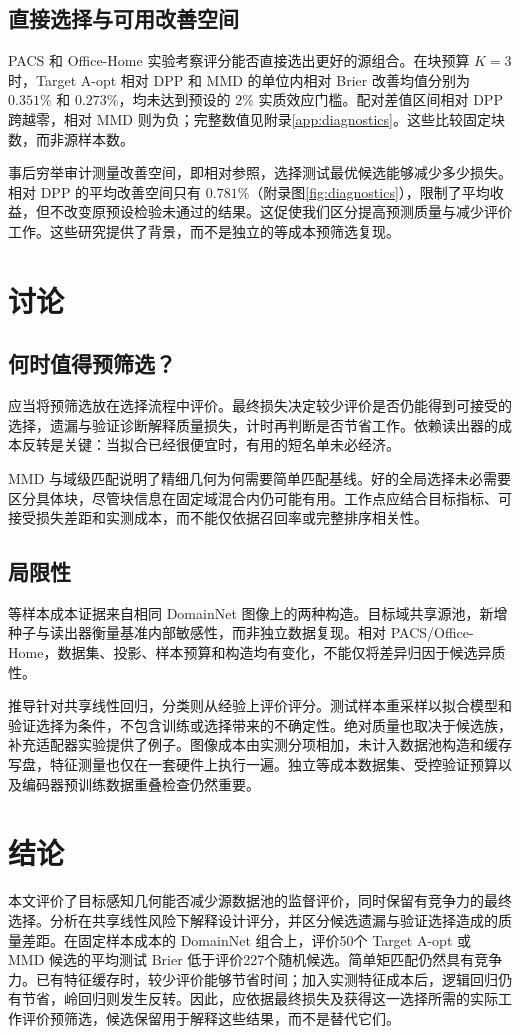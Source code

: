\subsection{直接选择与可用改善空间}
PACS 和 Office-Home 实验考察评分能否直接选出更好的源组合。在块预算 $K=3$ 时，Target A-opt 相对 DPP 和 MMD 的单位内相对 Brier 改善均值分别为 $0.351\%$ 和 $0.273\%$，均未达到预设的 $2\%$ 实质效应门槛。配对差值区间相对 DPP 跨越零，相对 MMD 则为负；完整数值见附录\ref{app:diagnostics}。这些比较固定块数，而非源样本数。

事后穷举审计测量改善空间，即相对参照，选择测试最优候选能够减少多少损失。相对 DPP 的平均改善空间只有 $0.781\%$（附录图\ref{fig:diagnostics}），限制了平均收益，但不改变原预设检验未通过的结果。这促使我们区分提高预测质量与减少评价工作。这些研究提供了背景，而不是独立的等成本预筛选复现。

\section{讨论}
\subsection{何时值得预筛选？}
应当将预筛选放在选择流程中评价。最终损失决定较少评价是否仍能得到可接受的选择，遗漏与验证诊断解释质量损失，计时再判断是否节省工作。依赖读出器的成本反转是关键：当拟合已经很便宜时，有用的短名单未必经济。

MMD 与域级匹配说明了精细几何为何需要简单匹配基线。好的全局选择未必需要区分具体块，尽管块信息在固定域混合内仍可能有用。工作点应结合目标指标、可接受损失差距和实测成本，而不能仅依据召回率或完整排序相关性。

\subsection{局限性}
\label{sec:limitations}
等样本成本证据来自相同 DomainNet 图像上的两种构造。目标域共享源池，新增种子与读出器衡量基准内部敏感性，而非独立数据复现。相对 PACS/Office-Home，数据集、投影、样本预算和构造均有变化，不能仅将差异归因于候选异质性。

推导针对共享线性回归，分类则从经验上评价评分。测试样本重采样以拟合模型和验证选择为条件，不包含训练或选择带来的不确定性。绝对质量也取决于候选族，补充适配器实验提供了例子。图像成本由实测分项相加，未计入数据池构造和缓存写盘，特征测量也仅在一套硬件上执行一遍。独立等成本数据集、受控验证预算以及编码器预训练数据重叠检查仍然重要。

\section{结论}
\label{sec:conclusion}
本文评价了目标感知几何能否减少源数据池的监督评价，同时保留有竞争力的最终选择。分析在共享线性风险下解释设计评分，并区分候选遗漏与验证选择造成的质量差距。在固定样本成本的 DomainNet 组合上，评价50个 Target A-opt 或 MMD 候选的平均测试 Brier 低于评价227个随机候选。简单矩匹配仍然具有竞争力。已有特征缓存时，较少评价能够节省时间；加入实测特征成本后，逻辑回归仍有节省，岭回归则发生反转。因此，应依据最终损失及获得这一选择所需的实际工作评价预筛选，候选保留用于解释这些结果，而不是替代它们。

